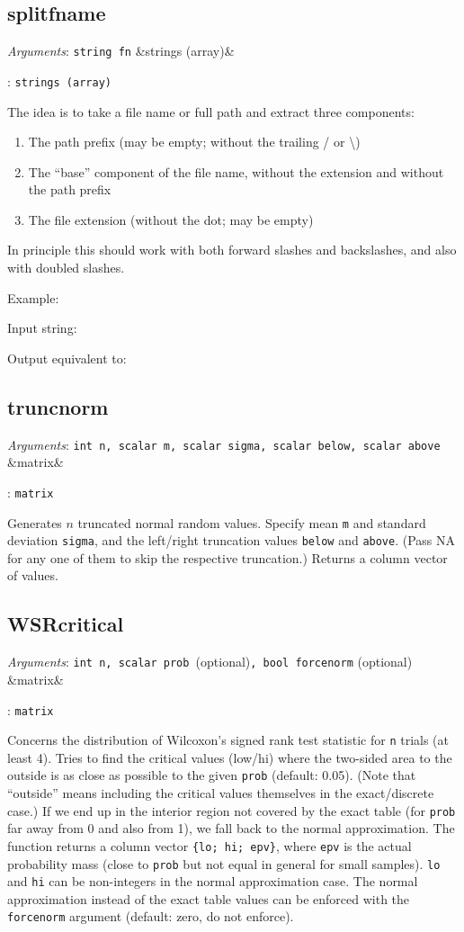 \documentclass[11pt,english]{article}
\newcommand{\ArgRet}[2]{%
  {\it Arguments}: {#1}%
  \ifx&#2&%
  \else
  \par\smallskip\noindent {\it Return type}: \texttt{#2}
  \fi%
  \par\medskip\par%
  }
\begin{document}
\subsection{splitfname}

\ArgRet{\texttt{string fn}}{strings (array)}

The idea is to take a file name or full path and extract three components:
\begin{enumerate}
\item The path prefix (may be empty; without the trailing / or \textbackslash)
\item The ``base'' component of the file name, without the extension
  and without the path prefix
\item The file extension (without the dot; may be empty)
\end{enumerate}
In principle this should work with both forward slashes and backslashes, and also
with doubled slashes.

Example:

Input string: 

Output equivalent to:



\subsection{truncnorm}

\ArgRet{\texttt{int n, scalar m, scalar sigma, scalar below, scalar
above}}{matrix}

Generates $n$ truncated normal random values. Specify mean \texttt{m}
and standard deviation \texttt{sigma}, and the left/right truncation values
\texttt{below} and \texttt{above}. (Pass NA for any one of them to
skip the respective truncation.) Returns a column vector of values.


\subsection{WSRcritical}

\ArgRet{\texttt{int n, scalar prob }(optional)\texttt{, bool forcenorm}
(optional)}{matrix}

Concerns the distribution of Wilcoxon's signed rank test statistic for
\texttt{n} trials (at least 4). Tries to find the critical values
(low/hi) where the two-sided area to the outside is as close as
possible to the given \texttt{prob} (default: 0.05). (Note that
``outside'' means including the critical values themselves in the
exact/discrete case.) If we end up in the interior region not covered
by the exact table (for \texttt{prob} far away from 0 and also from
1), we fall back to the normal approximation. The function returns a
column vector \verb|{lo; hi; epv}|, where \texttt{epv} is the actual
probability mass (close to \texttt{prob} but not equal in general for
small samples). \texttt{lo} and \texttt{hi} can be non-integers in the
normal approximation case. The normal approximation instead of the
exact table values can be enforced with the \texttt{forcenorm}
argument (default: zero, do not enforce).
\end{document}

